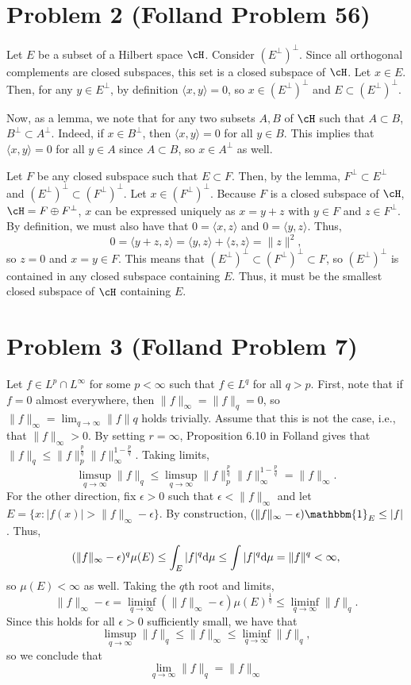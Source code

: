 \documentclass{article}
\begin{document}
\section{Problem 2 (Folland Problem 56)}
Let $E$ be a subset of a Hilbert space $\cH$. Consider $\left(E^\perp\right)^\perp$. Since all orthogonal complements are closed subspaces, this set is a closed subspace of $\cH$. Let $x\in E$. Then, for any $y\in E^\perp$, by definition $\langle x,y\rangle=0$, so $x\in\left(E^\perp\right)^\perp$ and $E\subset\left(E^\perp\right)^\perp$. 

Now, as a lemma, we note that for any two subsets $A,B$ of $\cH$ such that $A\subset B$, $B^\perp\subset A^\perp$. Indeed, if $x\in B^\perp$, then $\langle x,y\rangle=0$ for all $y\in B$. This implies that $\langle x,y\rangle=0$ for all $y\in A$ since $A\subset B$, so $x\in A^\perp$ as well.

Let $F$ be any closed subspace such that $E\subset F$. Then, by the lemma, $F^\perp\subset E^\perp$ and $\left(E^\perp\right)^\perp\subset \left(F^\perp\right)^\perp.$ Let $x\in \left(F^\perp\right)^\perp$. Because $F$ is a closed subspace of $\cH$, $\cH=F\oplus F^\perp$, $x$ can be expressed uniquely as $x=y+z$ with $y\in F$ and $z\in F^\perp$. By definition, we must also have that $0=\langle x,z\rangle$ and $0=\langle y,z\rangle$. Thus,
\[
0=\langle y+z,z\rangle=\langle y,z\rangle+\langle z,z\rangle=\|z\|^2,
\]
so $z=0$ and $x=y\in F$. This means that $\left(E^\perp\right)^\perp\subset \left(F^\perp\right)^\perp\subset F$, so $\left(E^\perp\right)^\perp$ is contained in any closed subspace containing $E$. Thus, it must be the smallest closed subspace of $\cH$ containing $E$. 

\section{Problem 3 (Folland Problem 7)}
Let $f\in L^p\cap L^\infty$ for some $p<\infty$ such that $f\in L^q$ for all $q>p$. First, note that if $f=0$ almost everywhere, then $\|f\|_\infty=\|f\|_q=0$, so $\|f\|_\infty=\lim_{q\to\infty}\|f\|q$ holds trivially. Assume that this is not the case, i.e., that $\|f\|_\infty>0$. By setting $r=\infty$, Proposition 6.10 in Folland gives that $\|f\|_q\leq\|f\|_p^{\frac{p}{q}}\|f\|_\infty^{1-\frac{p}{q}}$. Taking limits,
\[
\limsup_{q\to\infty}\|f\|_q\leq\limsup_{q\to\infty}\|f\|_p^{\frac{p}{q}}\|f\|_\infty^{1-\frac{p}{q}}=\|f\|_\infty.
\]
For the other direction, fix $\epsilon>0$ such that $\epsilon<\|f\|_\infty$ and let $E=\{x:|f(x)|>\|f\|_\infty-\epsilon\}$. By construction, $(\|f\|_\infty-\epsilon)\mathbbm{1}_E\leq|f|$. Thus,
\[
(\|f\|_\infty-\epsilon)^q\mu(E)\leq\int_E|f|^q\mathrm{d}\mu\leq\int|f|^q\mathrm{d}\mu=\|f\|^q<\infty,
\]
so $\mu(E)<\infty$ as well. Taking the $q$th root and limits,
\[
\|f\|_\infty-\epsilon=\liminf_{q\to\infty}(\|f\|_\infty-\epsilon)\mu(E)^{\frac{1}{q}}\leq\liminf_{q\to\infty}\|f\|_q.
\]
Since this holds for all $\epsilon>0$ sufficiently small, we have that
\[
\limsup_{q\to\infty}\|f\|_q\leq\|f\|_\infty\leq\liminf_{q\to\infty}\|f\|_q,
\]
so we conclude that
\[
\lim_{q\to\infty}\|f\|_q=\|f\|_\infty
\]
\end{document}
